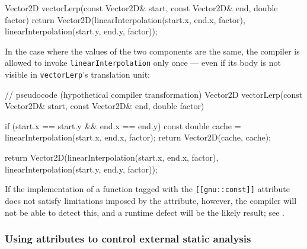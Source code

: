 \begin{emcppslisting}[language=C++]
Vector2D vectorLerp(const Vector2D& start, const Vector2D& end, double factor)
{
    return Vector2D(linearInterpolation(start.x, end.x, factor),
                    linearInterpolation(start.y, end.y, factor));
}
\end{emcppslisting}

\noindent In the case where the values of the two components
are the same, the compiler is allowed to invoke
\lstinline!linearInterpolation! only once --- even if its body is not
visible in \lstinline!vectorLerp!'s translation unit:

\begin{emcppslisting}[language=C++]
// pseudocode (hypothetical compiler transformation)
Vector2D vectorLerp(const Vector2D& start, const Vector2D& end, double factor)
{
    if (start.x == start.y && end.x == end.y)
    {
        const double cache = linearInterpolation(start.x, end.x, factor);
        return Vector2D(cache, cache);
    }

    return Vector2D(linearInterpolation(start.x, end.x, factor),
                    linearInterpolation(start.y, end.y, factor));
}
\end{emcppslisting}

\noindent If the implementation of a function tagged with the
\lstinline![[gnu::const]]! attribute does not satisfy limitations imposed by
the attribute, however, the compiler will not be able to detect this, and a runtime
defect will be the likely result;
  see .

\subsubsection[Using attributes to control external static analysis]{Using attributes to control external static analysis}\label{using-attributes-to-control-external-static-analysis}


